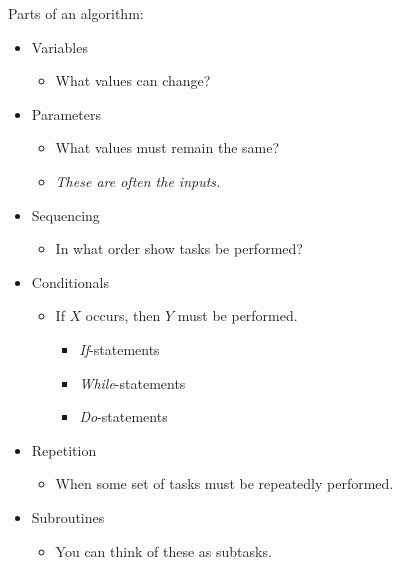 \documentclass[12pt]{article}
\theoremstyle{definition}
\begin{document}
\vfill

\newpage
Parts of an algorithm:

\begin{itemize}
	\item Variables
	\begin{itemize}
		\item What values can change?
	\end{itemize}	
	\item Parameters
	\begin{itemize}
		\item What values must remain the same?
		\item \emph{These are often the inputs.}
	\end{itemize}	
	\item Sequencing
	\begin{itemize}
		\item In what order show tasks be performed?
	\end{itemize}	
	\item Conditionals
	\begin{itemize}
		\item If $X$ occurs, then $Y$ must be performed.
	\begin{itemize}
		\item \emph{If}-statements
		\item \emph{While}-statements
		\item \emph{Do}-statements
	\end{itemize}
	\end{itemize}	

	\item Repetition
	\begin{itemize}
		\item When some set of tasks must be repeatedly performed.
	\end{itemize}
	\item Subroutines
	\begin{itemize}
		\item You can think of these as subtasks. 
	\end{itemize}
\end{itemize}

\newpage
\end{document}
